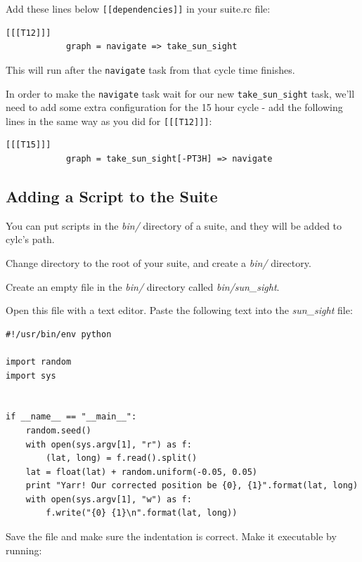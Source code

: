 Add these lines below \lstinline{[[dependencies]]} in your suite.rc file:

\lstset{language=suiterc}
\begin{lstlisting}[columns=fullflexible]
        [[[T12]]]
            graph = navigate => take_sun_sight
\end{lstlisting}

This will run after the \lstinline{navigate} task from that cycle time finishes.

In order to make the \lstinline{navigate} task wait for our new \lstinline{take_sun_sight} task, we'll need to add some extra configuration for the 15 hour cycle - add the following lines in the same way as you did for \lstinline{[[[T12]]]}:

\lstset{language=suiterc}
\begin{lstlisting}[columns=fullflexible]
        [[[T15]]]
            graph = take_sun_sight[-PT3H] => navigate
\end{lstlisting}


\subsection{Adding a Script to the Suite}

You can put scripts in the {\em bin/} directory of a suite, and they will be added to cylc's path.

Change directory to the root of your suite, and create a {\em bin/} directory.

Create an empty file in the {\em bin/} directory called {\em bin/sun\_sight}.

Open this file with a text editor. Paste the following text into the {\em sun\_sight} file:

\lstset{language=Python}
\begin{lstlisting}[columns=fullflexible]
#!/usr/bin/env python

import random
import sys


if __name__ == "__main__":
    random.seed()
    with open(sys.argv[1], "r") as f:
        (lat, long) = f.read().split()
    lat = float(lat) + random.uniform(-0.05, 0.05)
    print "Yarr! Our corrected position be {0}, {1}".format(lat, long)
    with open(sys.argv[1], "w") as f:
        f.write("{0} {1}\n".format(lat, long))
\end{lstlisting}

Save the file and make sure the indentation is correct. Make it executable by running:

